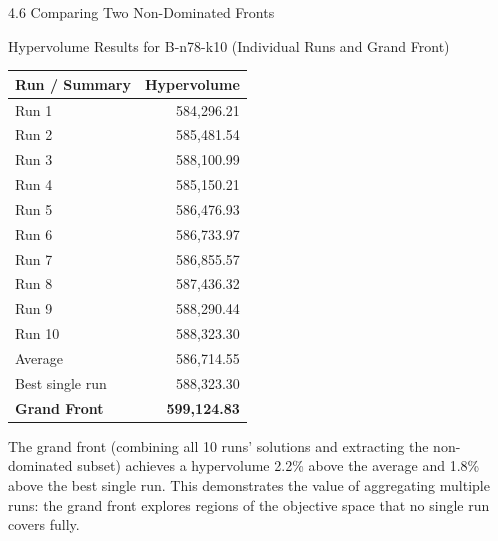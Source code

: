 \documentclass[aspectratio=169,10pt]{beamer}
\begin{document}
\begin{frame}[allowframebreaks]{4.6 Comparing Two Non-Dominated Fronts}
  \begin{block}{Hypervolume Results for B-n78-k10 (Individual Runs and Grand Front)}
    \begin{center}
      \small
      \begin{tabular}{lr}
        \toprule
        Run / Summary & Hypervolume \\
        \midrule
        Run 1  & 584{,}296.21 \\
        Run 2  & 585{,}481.54 \\
        Run 3  & 588{,}100.99 \\
        Run 4  & 585{,}150.21 \\
        Run 5  & 586{,}476.93 \\
        Run 6  & 586{,}733.97 \\
        Run 7  & 586{,}855.57 \\
        Run 8  & 587{,}436.32 \\
        Run 9  & 588{,}290.44 \\
        Run 10 & 588{,}323.30 \\
        \midrule
        Average         & 586{,}714.55 \\
        Best single run & 588{,}323.30 \\
        \textbf{Grand Front} & \textbf{599{,}124.83} \\
        \bottomrule
      \end{tabular}
    \end{center}
  \end{block}

  The grand front (combining all 10 runs' solutions and extracting the
  non-dominated subset) achieves a hypervolume 2.2\% above the average and 1.8\%
  above the best single run.  This demonstrates the value of aggregating multiple
  runs: the grand front explores regions of the objective space that no single
  run covers fully.

\end{frame}
\end{document}
